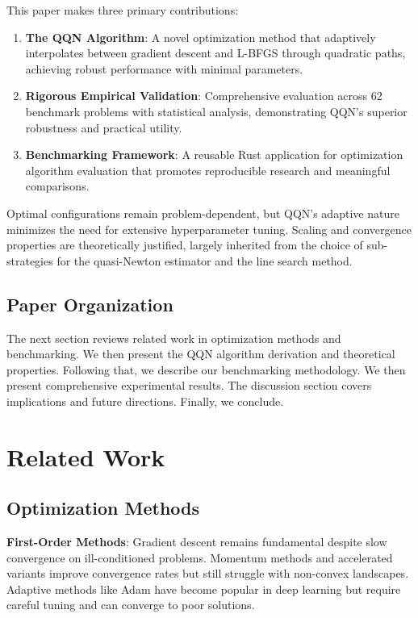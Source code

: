 This paper makes three primary contributions:

\begin{enumerate}
\def\labelenumi{\arabic{enumi}.}
\item
  \textbf{The QQN Algorithm}: A novel optimization method that adaptively interpolates between gradient descent and L-BFGS through quadratic paths, achieving robust performance with minimal parameters.
\item
  \textbf{Rigorous Empirical Validation}: Comprehensive evaluation across 62 benchmark problems with statistical analysis, demonstrating QQN's superior robustness and practical utility.
\item
  \textbf{Benchmarking Framework}: A reusable Rust application for optimization algorithm evaluation that promotes reproducible research and meaningful comparisons.
\end{enumerate}

Optimal configurations remain problem-dependent, but QQN's adaptive nature minimizes the need for extensive hyperparameter tuning.
Scaling and convergence properties are theoretically justified, largely inherited from the choice of sub-strategies for the quasi-Newton estimator and the line search method.

\hypertarget{paper-organization}{%
\subsection{Paper Organization}\label{paper-organization}}

The next section reviews related work in optimization methods and benchmarking.
We then present the QQN algorithm derivation and theoretical properties.
Following that, we describe our benchmarking methodology.
We then present comprehensive experimental results.
The discussion section covers implications and future directions.
Finally, we conclude.

\hypertarget{related-work}{%
\section{Related Work}\label{related-work}}

\hypertarget{optimization-methods}{%
\subsection{Optimization Methods}\label{optimization-methods}}

\textbf{First-Order Methods}: Gradient descent \citep{cauchy1847methode} remains fundamental despite slow convergence on ill-conditioned problems.
Momentum methods \citep{polyak1964some} and accelerated variants \citep{nesterov1983method} improve convergence rates but still struggle with non-convex landscapes.
Adaptive methods like Adam \citep{kingma2015adam} have become popular in deep learning but require careful tuning and can converge to poor solutions.

